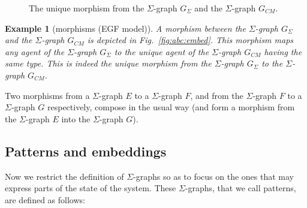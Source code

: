 \documentclass{entcs}
\newcommand{\graphsymb}{G}
\newtheorem{myexample}[thm]{Example}
\begin{document}
\begin{figure}[t]
\hfill{}\hfill\mbox{}
\caption{The unique morphism from the $\Sigma$-graph $\graphsymb_{\Sigma}$
and the $\Sigma$-graph $\graphsymb_{\textit{CM}}$.}
  \label{fig:egfr:embed}
\end{figure}
\begin{myexample}[morphisms (EGF model)]

A morphism between the $\Sigma$-graph $\graphsymb_{\Sigma}$ and the $\Sigma$-graph $\graphsymb_{\textit{CM}}$ is depicted in Fig.~\ref{fig:abc:embed}. This morphism maps any agent of the $\Sigma$-graph
$\graphsymb_{\Sigma}$ to the unique agent of the $\Sigma$-graph $\graphsymb_{\textit{CM}}$ having the same type.
This is indeed the unique morphism from the  $\Sigma$-graph
$\graphsymb_{\Sigma}$ to the $\Sigma$-graph $\graphsymb_{\textit{CM}}$.
\end{myexample}


Two morphisms from a $\Sigma$-graph  $E$ to a $\Sigma$-graph $F$, and from the $\Sigma$-graph $F$ to a $\Sigma$-graph $G$ respectively, compose in the usual way (and form a morphism from the $\Sigma$-graph $E$ into the
$\Sigma$-graph  $G$).

\subsection{Patterns and embeddings}

Now we restrict the definition of $\Sigma$-graphs so as to
focus on the ones that may express parts of the state of the system.
These $\Sigma$-graphs, that we call patterns, are defined as follows:
\end{document}
